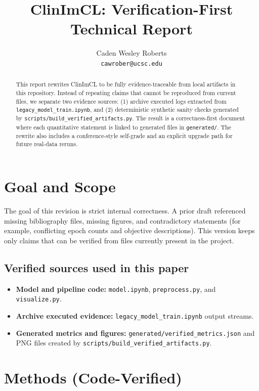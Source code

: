 \documentclass{article}
\title{ClinImCL: Verification-First Technical Report}
\author{Caden Wesley Roberts \\ \texttt{cawrober@ucsc.edu}}
\date{}
\begin{document}
\maketitle

\begin{abstract}
This report rewrites ClinImCL to be fully evidence-traceable from local artifacts in this repository. Instead of repeating claims that cannot be reproduced from current files, we separate two evidence sources: (1) archive executed logs extracted from \texttt{legacy\_model\_train.ipynb}, and (2) deterministic synthetic sanity checks generated by \texttt{scripts/build\_verified\_artifacts.py}. The result is a correctness-first document where each quantitative statement is linked to generated files in \texttt{generated/}. The rewrite also includes a conference-style self-grade and an explicit upgrade path for future real-data reruns.
\end{abstract}

\section{Goal and Scope}
The goal of this revision is strict internal correctness. A prior draft referenced missing bibliography files, missing figures, and contradictory statements (for example, conflicting epoch counts and objective descriptions). This version keeps only claims that can be verified from files currently present in the project.

\subsection{Verified sources used in this paper}
\begin{itemize}
  \item \textbf{Model and pipeline code:} \texttt{model.ipynb}, \texttt{preprocess.py}, and \texttt{visualize.py}.
  \item \textbf{Archive executed evidence:} \texttt{legacy\_model\_train.ipynb} output streams.
  \item \textbf{Generated metrics and figures:} \texttt{generated/verified\_metrics.json} and PNG files created by \texttt{scripts/build\_verified\_artifacts.py}.
\end{itemize}

\section{Methods (Code-Verified)}
\end{document}
